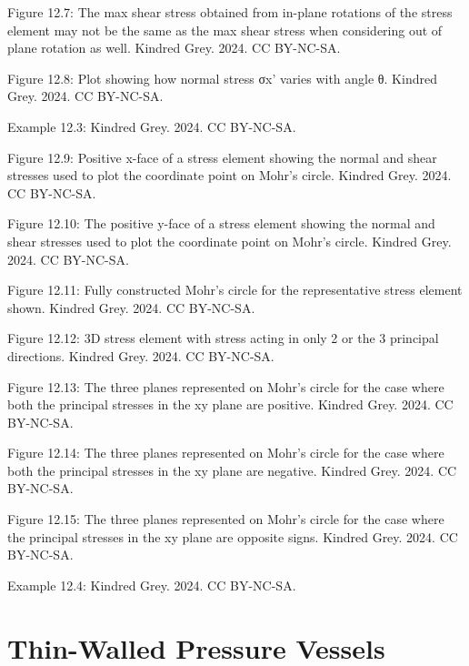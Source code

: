\documentclass[
  letterpaper,
  DIV=11,
  numbers=noendperiod]{scrreprt}
\theoremstyle{definition}
\theoremstyle{remark}
\begin{document}
Figure 12.7: The max shear stress obtained from in-plane rotations of
the stress element may not be the same as the max shear stress when
considering out of plane rotation as well. Kindred Grey. 2024. CC
BY-NC-SA.

Figure 12.8: Plot showing how normal stress σx' varies with angle θ.
Kindred Grey. 2024. CC BY-NC-SA.

Example 12.3: Kindred Grey. 2024. CC BY-NC-SA.

Figure 12.9: Positive x-face of a stress element showing the normal and
shear stresses used to plot the coordinate point on Mohr's circle.
Kindred Grey. 2024. CC BY-NC-SA.

Figure 12.10: The positive y-face of a stress element showing the normal
and shear stresses used to plot the coordinate point on Mohr's circle.
Kindred Grey. 2024. CC BY-NC-SA.

Figure 12.11: Fully constructed Mohr's circle for the representative
stress element shown. Kindred Grey. 2024. CC BY-NC-SA.

Figure 12.12: 3D stress element with stress acting in only 2 or the 3
principal directions. Kindred Grey. 2024. CC BY-NC-SA.

Figure 12.13: The three planes represented on Mohr's circle for the case
where both the principal stresses in the xy plane are positive. Kindred
Grey. 2024. CC BY-NC-SA.

Figure 12.14: The three planes represented on Mohr's circle for the case
where both the principal stresses in the xy plane are negative. Kindred
Grey. 2024. CC BY-NC-SA.

Figure 12.15: The three planes represented on Mohr's circle for the case
where the principal stresses in the xy plane are opposite signs. Kindred
Grey. 2024. CC BY-NC-SA.

Example 12.4: Kindred Grey. 2024. CC BY-NC-SA.


\chapter{Thin-Walled Pressure
Vessels}\label{sec-thin-walled-pressure-vessels}
\end{document}
